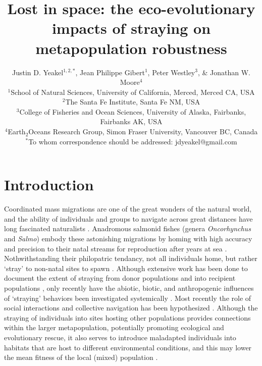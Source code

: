 \documentclass[twocolumn,preprintnumbers,amsmath,amssymb,superscriptaddress]{revtex4}
\begin{document}
\title{Lost in space: the eco-evolutionary impacts of straying on metapopulation robustness}
\author{Justin D. Yeakel${}^{1,2,*}$, Jean Philippe Gibert${}^{1}$, Peter Westley${}^{3}$, \& Jonathan W. Moore${}^{4}$ \\
${}^1$School of Natural Sciences, University of California, Merced, Merced CA, USA \\
${}^2$The Santa Fe Institute, Santa Fe NM, USA \\
${}^3$College of Fisheries and Ocean Sciences, University of Alaska, Fairbanks, Fairbanks AK, USA \\
${}^4$Earth${}_2$Oceans Research Group, Simon Fraser University, Vancouver BC, Canada \\
${}^*$To whom correspondence should be addressed: jdyeakel@gmail.com
}



\maketitle



\section{Introduction}


Coordinated mass migrations are one of the great wonders of the natural world, and the ability of individuals and groups to navigate across great distances have long fascinated naturalists \cite{MilnerGulland:2011vm}.
Anadromous salmonid fishes (genera \emph{Oncorhynchus} and \emph{Salmo}) embody these astonishing migrations by homing with high accuracy and precision to their natal streams for reproduction after years at sea \cite{Quinn:2011tf,Jonsson:2011kg,Keefer:2014gg}.
Nothwithstanding their philopatric tendancy, not all individuals home, but rather `stray' to non-natal sites to spawn \cite{Quinn:1993ge,Hendry:2004wf,H:2013fs}.
Although extensive work has been done to document the extent of straying from donor populations and into recipient populations \cite{Keefer:2014gg,Bett:2017ha}, only recently have the abiotic, biotic, and anthropogenic influences of `straying' behaviors been investigated systemically \cite{Keefer:2008bs,Westley:2015to,Bond:2016dz}.
Most recently the role of social interactions and collective navigation has been hypothesized \cite[][; this volume]{Berdahl:2015kv,Berdahl:2016dx}.
Although the straying of individuals into sites hosting other populations provides connections within the larger metapopulation, potentially promoting ecological and evolutionary rescue, it also serves to introduce maladapted individuals into habitats that are host to different environmental conditions, and this may lower the mean fitness of the local (mixed) population \cite{Muhlfeld:2014hs}.
\end{document}
